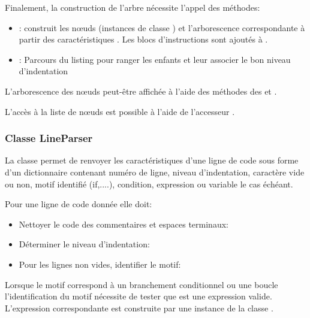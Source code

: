 Finalement, la construction de l'arbre  nécessite l'appel des méthodes:
\begin{itemize}
	\item {}: construit les n\oe uds (instances de classe ) et l'arborescence correspondante à partir des caractéristiques . Les blocs d'instructions sont ajoutés à .
	
	\item {}: Parcours du listing  pour ranger les enfants et leur associer le bon niveau d'indentation
\end{itemize} 


L'arborescence des n\oe uds  peut-être affichée à l'aide des méthodes des  et .

L'accès à la liste de n\oe uds  est possible à l'aide de l'accesseur .

\subsubsection{Classe LineParser}

La classe  permet de renvoyer les caractéristiques d'une ligne de code sous forme d'un dictionnaire contenant numéro de ligne, niveau d'indentation, caractère vide ou non, motif identifié (if,....), condition, expression ou variable le cas échéant.

Pour une ligne de code donnée elle doit:
\begin{itemize}
	\item Nettoyer le code des commentaires et espaces terminaux: 
	\item Déterminer le niveau d'indentation: 
	\item Pour les lignes non vides, identifier le motif: 
\end{itemize}

Lorsque le motif correspond à un branchement conditionnel  ou une boucle  l'identification du motif  nécessite de tester que  est une expression valide. L'expression correspondante est construite par une instance de la classe .


